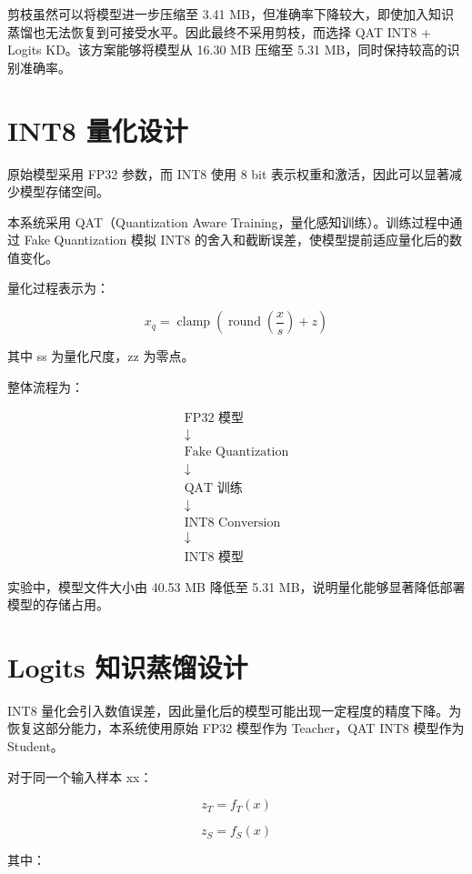 剪枝虽然可以将模型进一步压缩至 3.41 MB，但准确率下降较大，即使加入知识蒸馏也无法恢复到可接受水平。因此最终不采用剪枝，而选择 QAT INT8 + Logits KD。该方案能够将模型从 16.30 MB 压缩至 5.31 MB，同时保持较高的识别准确率。

\section{INT8 量化设计}

原始模型采用 FP32 参数，而 INT8 使用 8 bit 表示权重和激活，因此可以显著减少模型存储空间。

本系统采用 QAT（Quantization Aware Training，量化感知训练）。训练过程中通过 Fake Quantization 模拟 INT8 的舍入和截断误差，使模型提前适应量化后的数值变化。

量化过程表示为：

\[
x_q=
\operatorname{clamp}
\left(
\operatorname{round}\left(\frac{x}{s}\right)+z
\right)
\]

其中 ss 为量化尺度，zz 为零点。

整体流程为：

\[
\begin{gathered}
\text{FP32 模型}\\[-0.2em]
\downarrow\\[-0.2em]
\text{Fake Quantization}\\[-0.2em]
\downarrow\\[-0.2em]
\text{QAT 训练}\\[-0.2em]
\downarrow\\[-0.2em]
\text{INT8 Conversion}\\[-0.2em]
\downarrow\\[-0.2em]
\text{INT8 模型}
\end{gathered}
\]

实验中，模型文件大小由 40.53 MB 降低至 5.31 MB，说明量化能够显著降低部署模型的存储占用。

\section{Logits 知识蒸馏设计}

INT8 量化会引入数值误差，因此量化后的模型可能出现一定程度的精度下降。为恢复这部分能力，本系统使用原始 FP32 模型作为 Teacher，QAT INT8 模型作为 Student。

对于同一个输入样本 xx：

\[
z_T=f_T(x)
\]

\[
z_S=f_S(x)
\]

其中：


